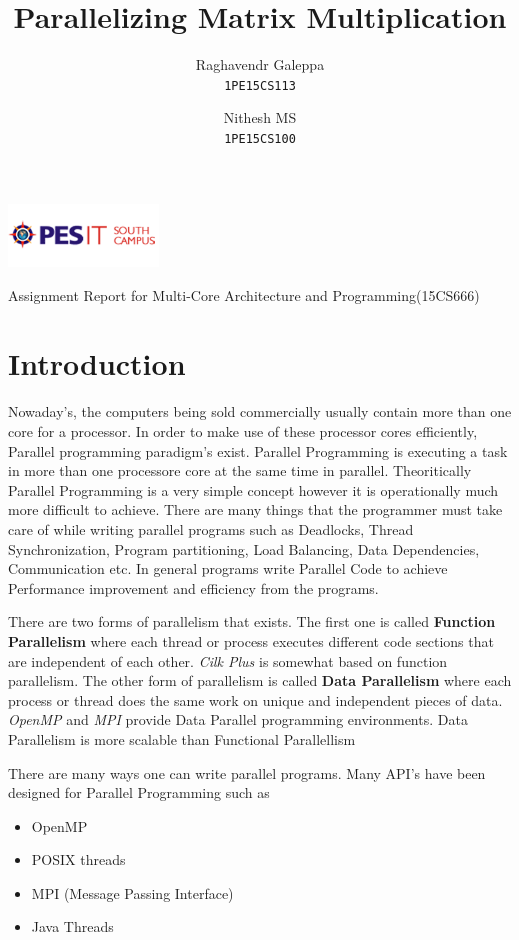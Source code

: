\documentclass{article}
\author{
	Raghavendr Galeppa\\
	\texttt{1PE15CS113}
	\and
	Nithesh MS\\
	\texttt{1PE15CS100}
}
\title{Parallelizing Matrix Multiplication}
\begin{document}
\maketitle 
\begin{center}
\includegraphics[width = 40mm]{PESIT-South-Logo.png}
\centerline{Assignment Report for Multi-Core Architecture and Programming(15CS666)}
\end{center}
\pagebreak

\section{Introduction}

Nowaday's, the computers being sold commercially usually contain more than one core for a processor.
In order to make use of these processor cores efficiently, Parallel programming paradigm's exist.
Parallel Programming is executing a task in more than one processore core at the same time in parallel.
Theoritically Parallel Programming is a very simple concept however it is operationally much more
difficult to achieve. There are many things that the programmer must take care of while writing parallel programs
such as Deadlocks, Thread Synchronization, Program partitioning, Load Balancing, Data Dependencies, Communication etc.
In general programs write Parallel Code to achieve Performance improvement and efficiency from the programs.


There are two forms of parallelism that exists. The first one is called \textbf{Function Parallelism} where 
each thread or process executes different code sections that are independent of each other. \textit{Cilk Plus} is 
somewhat based on function parallelism. The other form of parallelism is called \textbf{Data Parallelism} 
where each process or thread does the same work on unique and independent pieces of data. \textit{OpenMP} and \textit{MPI} 
provide Data Parallel programming environments.
Data Parallelism is more scalable than Functional Parallellism

There are many ways one can write parallel programs. Many API's have been designed for Parallel Programming such as
\begin{itemize}
\item OpenMP
\item POSIX threads
\item MPI (Message Passing Interface)
\item Java Threads
\end{itemize}
\end{document}
